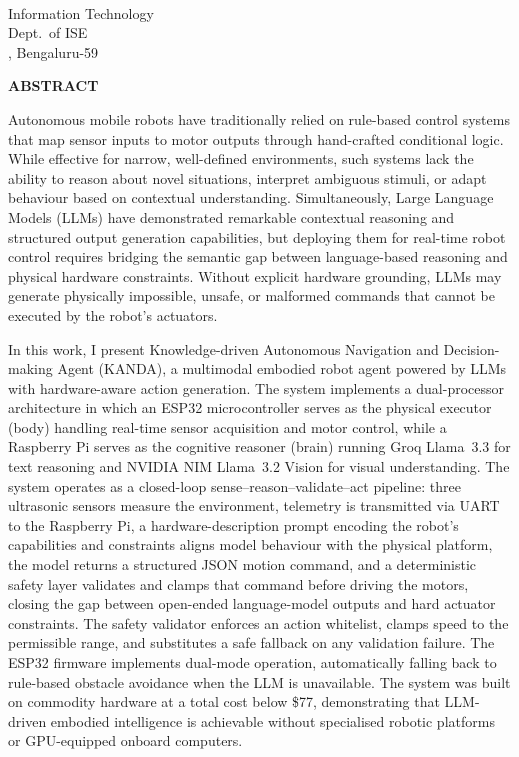         \begin{flushright}
        \textbf{\StudentName}\\
        Information Technology\\
        Dept.\ of ISE\\
        \College, Bengaluru-59
        \end{flushright}
    
        \newpage
        \thispagestyle{empty}
        \begin{center}
        {\Large\bfseries ABSTRACT}
        \end{center}
        \vspace{12pt}
    Autonomous mobile robots have traditionally relied on rule-based control systems that map sensor inputs to motor outputs through hand-crafted conditional logic. While effective for narrow, well-defined environments, such systems lack the ability to reason about novel situations, interpret ambiguous stimuli, or adapt behaviour based on contextual understanding. Simultaneously, Large Language Models (LLMs) have demonstrated remarkable contextual reasoning and structured output generation capabilities, but deploying them for real-time robot control requires bridging the semantic gap between language-based reasoning and physical hardware constraints. Without explicit hardware grounding, LLMs may generate physically impossible, unsafe, or malformed commands that cannot be executed by the robot's actuators.

    In this work, I present Knowledge-driven Autonomous Navigation and Decision-making Agent (KANDA), a multimodal embodied robot agent powered by LLMs with hardware-aware action generation. The system implements a dual-processor architecture in which an ESP32 microcontroller serves as the physical executor (body) handling real-time sensor acquisition and motor control, while a Raspberry Pi serves as the cognitive reasoner (brain) running Groq Llama~3.3 for text reasoning and NVIDIA NIM Llama~3.2 Vision for visual understanding. The system operates as a closed-loop sense--reason--validate--act pipeline: three ultrasonic sensors measure the environment, telemetry is transmitted via UART to the Raspberry Pi, a hardware-description prompt encoding the robot's capabilities and constraints aligns model behaviour with the physical platform, the model returns a structured JSON motion command, and a deterministic safety layer validates and clamps that command before driving the motors, closing the gap between open-ended language-model outputs and hard actuator constraints. The safety validator enforces an action whitelist, clamps speed to the permissible range, and substitutes a safe fallback on any validation failure. The ESP32 firmware implements dual-mode operation, automatically falling back to rule-based obstacle avoidance when the LLM is unavailable. The system was built on commodity hardware at a total cost below \$77, demonstrating that LLM-driven embodied intelligence is achievable without specialised robotic platforms or GPU-equipped onboard computers.
    
